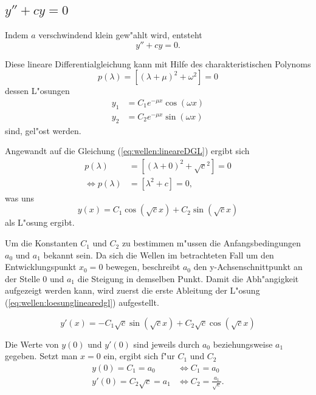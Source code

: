 \subsection{\texorpdfstring{$y''+cy = 0$}{y''+cy = 0}}
Indem $a$ verschwindend klein gew"ahlt wird, entsteht
\begin{equation}
	y''+ cy = 0.
	\label{eq:wellen:lineareDGL}
\end{equation}

Diese lineare Differentialgleichung kann mit Hilfe des charakteristischen 
Polynoms
\begin{equation*}
	p(\lambda) = [(\lambda+\mu)^2+\omega^2] = 0
\end{equation*}
dessen L"osungen
\begin{equation*}
	\begin{split}
		y_1 &= C_1e^{-\mu x}\cos(\omega x) \\
		y_2 &= C_2e^{-\mu x}\sin(\omega x)
	\end{split}
\end{equation*}
sind, gel"ost werden.

Angewandt auf die Gleichung (\ref{eq:wellen:lineareDGL}) ergibt sich
\begin{equation*}
	\begin{split}
		p(\lambda) &= [(\lambda+0)^2+\sqrt{c}^2] = 0 \\
		\Leftrightarrow p(\lambda) &= [\lambda^2+c] = 0,
	\end{split}
\end{equation*}
was uns
\begin{equation}
	y(x) = C_1 \cos(\sqrt{c}x) + C_2 \sin(\sqrt{c}x)
	\label{eq:wellen:loesunglinearedgl}
\end{equation}
als L"osung ergibt.

Um die Konstanten $C_1$ und $C_2$ zu bestimmen m"ussen die Anfangsbedingungen 
$a_0$ und $a_1$ bekannt sein. Da sich die Wellen im betrachteten Fall um den 
Entwicklungspunkt $x_0=0$ bewegen, beschreibt $a_0$ den y-Achsenschnittpunkt an 
der Stelle $0$ und $a_1$ die Steigung in demselben Punkt. Damit die 
Abh"angigkeit aufgezeigt werden kann, wird zuerst die erste Ableitung der 
L"osung (\ref{eq:wellen:loesunglinearedgl}) aufgestellt.

\begin{equation}
	y'(x)=-C_1 \sqrt{c} \sin(\sqrt{c}x) + C_2 \sqrt{c} \cos(\sqrt{c}x)
\end{equation}

Die Werte von $y(0)$ und $y'(0)$ sind jeweils durch $a_0$ beziehungsweise $a_1$ 
gegeben. Setzt man $x = 0$ ein, ergibt sich f"ur $C_1$ und $C_2$
\begin{equation}
	\begin{split}
		y(0) = C_1 = a_0 &\Leftrightarrow C_1 = a_0 \\
		y'(0) = C_2 \sqrt{c} = a_1 &\Leftrightarrow C_2 = \frac{a_1}{\sqrt{c}}.
	\end{split}
\end{equation}


